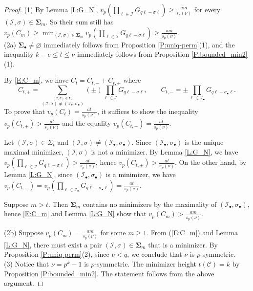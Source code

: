 \documentclass{amsart}
\numberwithin{equation}{section}
\newcommand{\bSig}{\mathbf\Sigma}
\newcommand{\Sb}{\bSig_\bullet}
\newcommand{\Ib}{\cI_\bullet}
\newcommand{\sbb}{\sigma_\bullet}
\newcommand{\cC}{\mathcal{C}}
\newcommand{\cI}{\mathcal{I}}
\theoremstyle{plain}
\theoremstyle{definition}
\begin{document}
\begin{proof}
(1) By Lemma \ref{L:G_N},
$ v_p(\prod_{\ell\in \cI}
    G_{q\ell - \sigma \ell})\ge \frac{am}{s_p(\nu)}
$ for every $(\cI,\sigma)\in \bSig_m$.
So their sum still has 
$v_p(C_m) \ge \min_{(\cI,\sigma)\in\bSig_m} v_p(\prod_{\ell\in \cI}
    G_{q\ell - \sigma \ell})\ge \frac{am}{s_p(\nu)}.$
\\
(2a)
$\Sb \ne \varnothing$ immediately follows from
Proposition \ref{P:uniq-perm}(1),
and the inequality $k-e \le t \le \nu$ immediately follows from
Proposition \ref{P:bounded_min2}(1).

By \eqref{E:C_m}, we have 
$
C_t=C_{t,-} + C_{t,+}
$
where 
\begin{equation*}
    C_{t,+}= 
    \sum_{\stackrel{(\cI,\sigma)\in \bSig_t}{(\cI,\sigma)\ne (\Ib,\sbb)}}
    (\pm)\prod_{\ell\in \cI} G_{q \ell - \sigma\ell},\qquad
C_{t,-}=\pm \prod_{\ell\in \Ib}G_{q\ell-\sbb\ell}.
\end{equation*}
To prove that $v_p(C_t)=\frac{at}{s_p(\nu)}$, it suffices to show
the inequality
$v_p(C_{t,+})>\frac{at}{s_p(\nu)}$
and the equality
$v_p(C_{t,-})=\frac{at}{s_p(\nu)}$.   

Let  $(\cI,\sigma)\in \Sigma_t$ and $(\cI,\sigma)\neq (\Ib,\sbb)$.
Since $(\Ib,\sbb)$ is the unique maximal minimizer,
$(\cI,\sigma)$ is not a minimizer.
By Lemma \ref{L:G_N}, we have
 $
        v_p\left(\prod_{\ell \in \cI} G_{q\ell - \sigma\ell}\right)
            > \frac{at}{s_p(\nu)}
$,
hence
 $v_p(C_{t,+})>\frac{at}{s_p(\nu)}$.
On the other hand, by Lemma \ref{L:G_N}, since $(\Ib,\sbb)$ is a minimizer,
we have
$v_p(C_{t,-})=
v_p(\prod_{\ell\in \Ib}G_{q\ell-\sbb\ell}) = \frac{at}{s_p(\nu)}$.

Suppose $m>t$.
Then $\bSig_m$ contains no minimizers by the maximality of $(\Ib,\sbb)$, 
hence \eqref{E:C_m} and Lemma \ref{L:G_N} show that 
$v_p(C_m)>\frac{am}{s_p(\nu)}$.

\noindent 
(2b)
Suppose $v_p(C_m)=\frac{a m}{s_p(\nu)}$ for some $m\ge 1$.
From (\ref{E:C_m}) and Lemma \ref{L:G_N},
there must exist a pair $(\cI,\sigma)\in \bSig_m$ 
that is a minimizer.
By  Proposition \ref{P:uniq-perm}(2), since $\nu<q$, 
we conclude that $\nu$ is $p$-symmetric.    
\\
(3) 
Notice that  $\nu=p^k-1$ is $p$-symmetric.
The minimizer height $t(\cC)=k$ by Proposition \ref{P:bounded_min2}.
The statement follows from the above argument. 
\end{proof}
\end{document}

